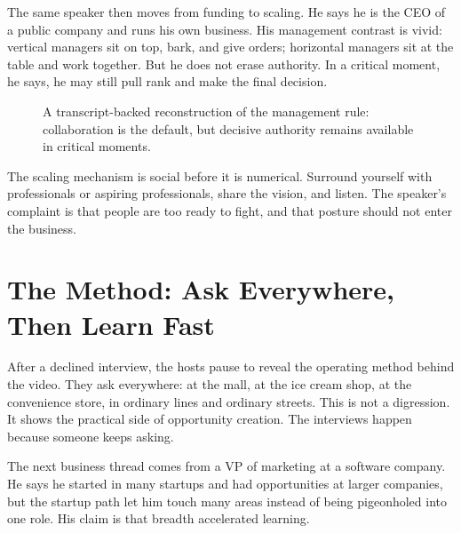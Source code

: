 The same speaker then moves from funding to scaling. He says he is the CEO of a public company and runs his own business. His management contrast is vivid: vertical managers sit on top, bark, and give orders; horizontal managers sit at the table and work together. But he does not erase authority. In a critical moment, he says, he may still pull rank and make the final decision.

\begin{figure}
\centering
{}
\caption{A transcript-backed reconstruction of the management rule: collaboration is the default, but decisive authority remains available in critical moments.}
\end{figure}

The scaling mechanism is social before it is numerical. Surround yourself with professionals or aspiring professionals, share the vision, and listen. The speaker's complaint is that people are too ready to fight, and that posture should not enter the business.

\section{The Method: Ask Everywhere, Then Learn Fast}

After a declined interview, the hosts pause to reveal the operating method behind the video. They ask everywhere: at the mall, at the ice cream shop, at the convenience store, in ordinary lines and ordinary streets. This is not a digression. It shows the practical side of opportunity creation. The interviews happen because someone keeps asking.

The next business thread comes from a VP of marketing at a software company. He says he started in many startups and had opportunities at larger companies, but the startup path let him touch many areas instead of being pigeonholed into one role. His claim is that breadth accelerated learning.

